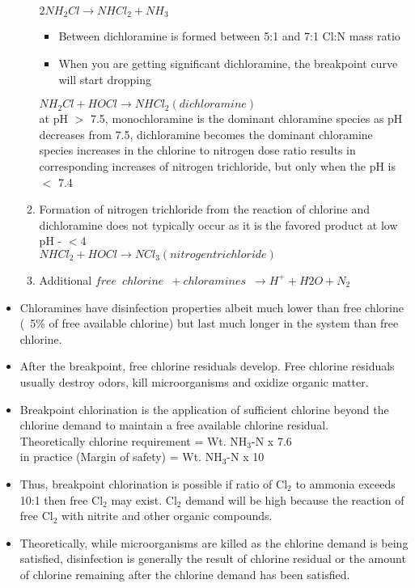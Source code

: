 \begin{itemize}
\begin{enumerate}
					$2NH_2Cl \rightarrow NHCl_2 + NH_3$
						\begin{itemize}
							\item Between dichloramine is formed between 5:1 and 7:1 Cl:N mass ratio
							\item When you are getting significant dichloramine, the breakpoint curve will start dropping
						\end{itemize}
						$NH_2Cl + HOCl  \rightarrow NHCl_2 (dichloramine)$\\
						at pH $>$ 7.5, monochloramine is the dominant chloramine species as pH decreases from 7.5, dichloramine becomes the dominant chloramine species increases in the chlorine to nitrogen dose ratio results in corresponding increases of nitrogen trichloride, but only when the pH is $<$ 7.4\\
					\item Formation of nitrogen trichloride from the reaction of chlorine and dichloramine does not typically occur as it is the favored product at low pH - $<$4\\
					$NHCl_2 + HOCl  \rightarrow NCl_3 (nitrogen trichloride)$\\
					\item Additional $free \enspace chlorine \enspace + chloramines \enspace \rightarrow H^+ + H2O + N_2$
				\end{enumerate}
				\item Chloramines have disinfection properties albeit much lower than free chlorine (~5\% of free available chlorine) but last much longer in the system than free chlorine. 
				\item After the breakpoint, free chlorine residuals develop. Free chlorine residuals usually destroy odors, kill microorganisms and oxidize organic matter.
				\item Breakpoint chlorination is the application of sufficient chlorine beyond the chlorine demand to maintain a free available chlorine residual.\\  Theoretically chlorine requirement = Wt. NH$_3$-N x 7.6\\
				in practice (Margin of safety)     = Wt. NH$_3$-N x 10\\
				\item Thus, breakpoint chlorination is possible if ratio of Cl$_2$ to ammonia exceeds 10:1 then free Cl$_2$ may exist. Cl$_2$ demand will be high because the reaction of free Cl$_2$ with nitrite and other organic compounds. 
				\item Theoretically, while microorganisms are killed as the chlorine demand is being satisfied, disinfection is generally the result of chlorine residual or the amount of chlorine remaining after the chlorine demand has been satisfied.
			\end{itemize}
